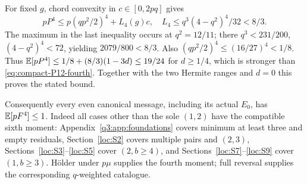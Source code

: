 For fixed $g$, chord convexity in $c\in[0,2pq]$ gives
\[
 pP^4\le p(qp^2/2)^4+L_4(g)c,\quad
 L_4\le q^3(4-q^2)^4/32<8/3.
\]
The maximum in the last inequality occurs at $q^2=12/11$;
there $q^3<231/200$, $(4-q^2)^4<72$, yielding $2079/800<8/3$.
Also $(qp^2/2)^4\le(16/27)^4<1/8$.
Thus $\mathbb E[pP^4]\le1/8+(8/3)(1-3d)\le19/24$ for $d\ge1/4$,
which is stronger than \eqref{eq:compact-P12-fourth}.
Together with the two Hermite ranges and $d=0$ this proves the stated bound.

\label{loc:even-zero-catalogue}
Consequently every even canonical message, including its actual $E_0$,
has $\mathbb E[pF^4]\le1$. Indeed all cases other than the sole $(1,2)$ have
the compatible sixth moment: Appendix~\ref{q3:app:foundations} covers
minimum at least three and empty residuals, Section~\ref{loc:S2} covers
multiple pairs and $(2,3)$, Sections~\ref{loc:S3}--\ref{loc:S5} cover
$(2,b\ge4)$, and Sections~\ref{loc:S7}--\ref{loc:S9} cover $(1,b\ge3)$.
H\"older under $p\mu$ supplies the fourth moment; full reversal supplies
the corresponding $q$-weighted catalogue.
